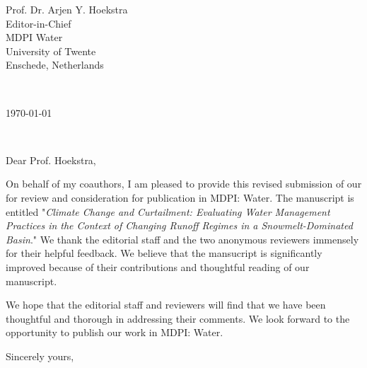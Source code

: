 \documentclass[10pt,letterpaper]{letter} %
\def\opening#1{\thispagestyle{empty}
{\centering\fromaddress \vspace{0.1in} \\ %
\begin{flushright}\today\end{flushright}} %
{\raggedright \toname \\ \toaddress \par} %
\vspace{0.1in} %
\noindent #1 %
}
\begin{document}

\begin{letter}
{Prof. Dr. Arjen Y. Hoekstra\\
Editor-in-Chief\\
MDPI Water\\
University of Twente\\
Enschede, Netherlands\\
}


\opening{Dear Prof. Hoekstra,}

On behalf of my coauthors, I am pleased to provide this revised submission of our for review and consideration for publication in MDPI: Water. The manuscript is entitled "\textit{Climate Change and Curtailment: Evaluating Water Management Practices in the Context of Changing Runoff Regimes in a Snowmelt-Dominated Basin}." We thank the editorial staff and the two anonymous reviewers immensely for their helpful feedback. We believe that the mansucript is significantly improved because of their contributions and thoughtful reading of our manuscript.

We hope that the editorial staff and reviewers will find that we have been thoughtful and thorough in addressing their comments. We look forward to the opportunity to publish our work in MDPI: Water.

\closing{Sincerely yours,}


\end{letter}
\end{document}
